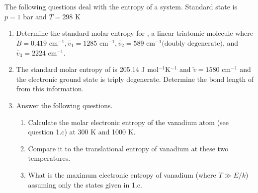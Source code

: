 \item The following questions deal with the entropy of a system. Standard state is $p=1$ bar and $T=298$ K
\begin{enumerate}
    \item Determine the standard molar entropy for , a linear triatomic molecule
          where $\tilde{B}=0.419\text{ cm}^{-1},\tilde{v_1}=1285\text{ cm}^{-1},\tilde{v_2}=589\text{ cm}^{-1}
              \text{(doubly degenerate)}$, and $\tilde{v_3}=2224\text{ cm}^{-1}$.
    \item The standard molar entropy of  is 205.14 J mol$^{-1}$K$^{-1}$ and $\tilde{v}=1580$ cm$^{-1}$
          and the electronic ground state is triply degenerate. Determine the bond length of 
          from this information.
    \item Answer the following questions.
          \begin{enumerate}
              \item Calculate the molar electronic entropy of the vanadium atom (see question 1.c)
                    at 300 K and 1000 K.
              \item Compare it to the translational entropy of vanadium at these two temperatures.
              \item What is the maximum electronic entropy of vanadium (where $T\gg E/k$)
                    assuming only the states given in 1.c.
          \end{enumerate}
\end{enumerate}

